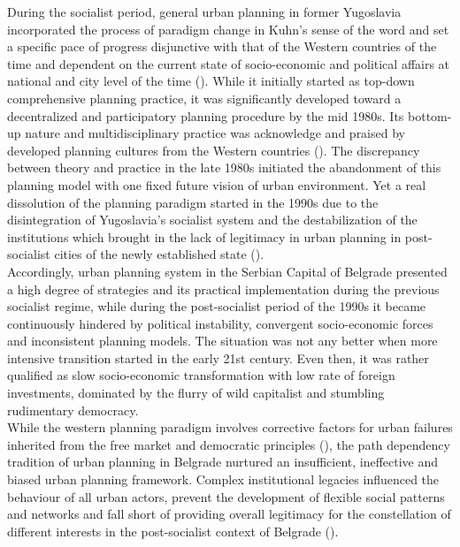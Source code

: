 \documentclass[11pt]{report}
\begin{document}
During the socialist period, general urban planning in former Yugoslavia incorporated the process of paradigm change in Kuhn’s sense of the word and set a specific pace of progress disjunctive with that of the Western countries of the time and dependent on the current state of socio-economic and political affairs at national and city level of the time (\href{Bajic}{\citealt{bajic-brkovic_city_2002}}).
While it initially started as top-down comprehensive planning practice, it was significantly developed toward a decentralized and participatory planning procedure by the mid 1980s. Its bottom-up nature and multidisciplinary practice was acknowledge and praised by developed planning cultures from the Western countries (\href{Cullingworth}{\citealt{cullingworth_planning_1997}}).
The discrepancy between theory and practice in the late 1980s initiated the abandonment of this planning model with one fixed future vision of urban environment.
Yet a real dissolution of the planning paradigm started in the 1990s due to the disintegration of Yugoslavia’s socialist system and the destabilization of the institutions which brought in the lack of legitimacy in urban planning in post-socialist cities of the newly established state (\href{Vujosevic}{\citealt{vujosevic_post-socialist_2010}}).
\\

Accordingly,  urban planning system in the Serbian Capital  of  Belgrade presented  a  high  degree  of  strategies  and  its practical  implementation  during  the  previous  socialist  regime,  while during the post-socialist period of the 1990s  it became  continuously  hindered  by  political instability, convergent socio-economic forces and inconsistent planning models.
The situation was not any better when more intensive transition started in the early 21st century. Even then, it was rather qualified as slow socio-economic transformation with low rate of foreign investments,  dominated  by  the  flurry  of  wild  capitalist  and  stumbling  rudimentary democracy.
\\

While the western planning paradigm involves corrective factors for urban failures inherited from the free market and democratic principles (\href{nedovic}{\citealt{nedovic-budic_adjustment_2001}}), the path dependency tradition of urban planning in Belgrade nurtured an insufficient, ineffective and biased urban  planning  framework. 
Complex institutional  legacies  influenced  the  behaviour  of  all  urban  actors,  prevent  the  development  of  flexible  social  patterns  and networks and fall short of providing overall legitimacy for the constellation of different interests in the post-socialist context of Belgrade (\href{Petrovic}{\citealt{petrovic_cities_2009}}).
\\
\end{document}
